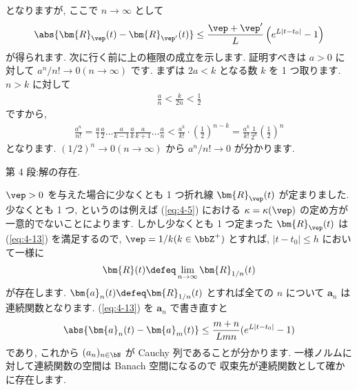 \documentclass[openany, a4paper, oneside]{jsbook}
\begin{document}
となりますが, ここで $n\to\infty$ として
\begin{gather}
 \abs{\bm{R}_{\vep} (t) - \bm{R}_{\vep '} (t)}
 \leq
 \frac{\vep + \vep '} {L} \left ( e^{ L | t - t_0 | } -1 \right) \label{eq:4-13}
\end{gather}
が得られます.
次に行く前に上の極限の成立を示します. 証明すべきは $a>0$ に対して $a^n/n! \to 0 ( n \to \infty )$ です.
まずは $2a<k$ となる数 $k$ を 1 つ取ります.
$n>k$ に対して
\begin{gather}
 \frac{a}{n}
 <
 \frac{k}{2n}
 <
 \frac{1}{2}
\end{gather}
ですから,
\begin{gather}
 \frac{a^n} {n!}
 =
 \frac{a}{1} \frac{a}{2} \dots \frac{a}{k-1} \frac{a}{k} \frac{a}{k+1} \dots \frac{a}{n}
 <
 \frac{a^k}{k!} \cdot \left ( \frac{1}{2} \right) ^{n-k}
 =
 \frac{a^k}{k!} \frac{1}{2^k} \left ( \frac{1}{2} \right)^n
\end{gather}
となります.
$(1/2)^n \to 0 (n \to \infty)$ から $a^n/n! \to 0$ が分かります.

第 4 段:解の存在.

$\vep>0$ を与えた場合に少なくとも 1 つ折れ線 $\bm{R}_{\vep}(t)$ が定まりました.
少なくとも 1 つ, というのは例えば (\ref{eq:4-5}) における $\kappa = \kappa (\vep)$ の定め方が
一意的でないことによります.
しかし少なくとも 1 つ定まった $\bm{R}_{\vep}(t)$ は (\ref{eq:4-13}) を満足するので,
$\vep = 1/k (k \in \bbZ^+)$ とすれば,  $| t - t_0 | \leq h$ において一様に
\begin{gather}
\bm{R}(t)
\defeq
\lim_{n\to\infty} \bm{R}_{ 1/n } (t)
\label{eq:4-14}
\end{gather}
が存在します.
$\bm{a}_n (t) \defeq \bm{R}_{1/n}(t)$ とすれば全ての $n$ について $\bm{a}_n$ は連続関数となります.
(\ref{eq:4-13}) を $\bm{a}_n$ で書き直すと
\begin{gather}
\abs{\bm{a}_n (t) - \bm{a}_m (t)}
\leq
\frac{m + n} {Lmn} ( e^{ L | t - t_0 |} - 1 )
\label{eq:4-1.42}
\end{gather}
であり, これから $(a_n)_{n\in \bN}$ が Cauchy 列であることが分かります.
一様ノルムに対して連続関数の空間は Banach 空間になるので
収束先が連続関数として確かに存在します.
\end{document}
